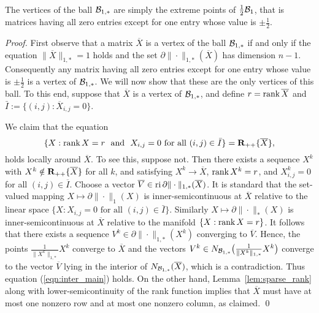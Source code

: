 \documentclass[smallextended,numbook]{svjour3}
\begin{document}
\begin{thm} \label{thm:vert}{\hfill \\}
The vertices of the ball ${{\cal B}}_{1,*}$ are simply the extreme points of $\frac{1}{2}{{\cal B}}_{1}$, that is 
matrices having all zero entries except for one entry whose value is $\pm\frac{1}{2}$.
\end{thm}
\begin{proof}
First observe that  a matrix $\overline{X}$ is a vertex of the ball ${{\cal B}}_{1,*}$ if and only if the equation $\|\overline{X}\|_{1,*}= 1$ holds and the set $\partial\|\cdot\|_{1,*}(\overline{X})$ has dimension $n-1$. Consequently any matrix having all zero entries except for one entry whose value is $\pm\frac{1}{2}$ is a vertex of ${{\cal B}}_{1,*}$. We will now show that these are the only vertices of this ball. To this end, suppose that $\overline{X}$ is a vertex of ${{\cal B}}_{1,*}$, and define $r={\mbox{\rm rank}\,} \overline{X}$ and $\bar{I}:=\{(i,j):\overline{X}_{i,j}=0\}$.

We claim that the equation
\begin{equation}\label{eqn:inter_main}
\{X: {\mbox{\rm rank}\,} X = r ~\textrm{ and }~ X_{i,j}=0 \textrm{ for all } (i,j)\in \bar{I}\} = {{\bf R}}_{++}\{\overline{X}\},
\end{equation}
holds locally around $\overline{X}$. To see this, suppose not. Then there exists a sequence $X^k$ with $X^k\notin {{\bf R}}_{++}\{\overline{X}\}$ for all $k$, and satisfying 
$X^{k}\to\overline{X}$, ${\mbox{\rm rank}\,} X^k = r$, and $X^k_{i,j}=0$ for all $(i,j)\in\overline{I}$.
Choose a vector $\overline{V}\in{\mbox{\rm ri}\,} \partial \|\cdot\|_{1,*}(\overline{X})$. It is standard that the set-valued mapping $X\mapsto \partial \|\cdot\|_1(X)$ is inner-semicontinuous at $\overline{X}$ relative to the linear space $\{X: X_{i,j}=0 \textrm{ for all } (i,j)\in \bar{I}\}$. Similarly $X\mapsto \partial \|\cdot\|_{*}(X)$ is inner-semicontinuous at $\overline{X}$ relative to the manifold $\{X: {\mbox{\rm rank}\,} X = r\}$. It follows that  there exists a sequence $V^k\in \partial \|\cdot \|_{1,*}(X^k)$ converging to $\overline{V}$. Hence, the points $\frac{1}{\|X^k\|_{1,*}}X^k$ converge to $\overline{X}$ and the vectors $V^k\in N_{{{\cal B}}_{1,*}}\big(\frac{1}{\|X^k\|_{1,*}}X^k\big)$ converge to the vector $\overline{V}$ lying in the interior of $N_{{{\cal B}}_{1,*}}(\overline{X})$, which is a contradiction.
Thus equation (\ref{eqn:inter_main}) holds.
On the other hand, Lemma~\ref{lem:sparse_rank} along with lower-semicontinuity of the rank function implies that $\overline{X}$ must have at most one nonzero row and at most one nonzero column, as claimed. \qed
\end{proof}
\end{document}
